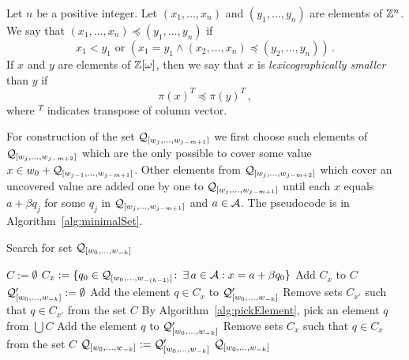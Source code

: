 \begin{defn}
\label{def:lexicographical}
Let $n$ be a positive integer. Let $(x_1, \dots, x_n)$ and $(y_1, \dots, y_n)$ are elements of $\mathbb{Z}^n$. We say that $(x_1, \dots, x_n)\preceq (y_1, \dots, y_n)$ if 
$$
x_1<y_1 \text{ or } \left(x_1=y_1 \wedge (x_2, \dots, x_n)\preceq (y_2, \dots, y_n)\right)\,.
$$
If $x$ and $y$ are elements of $\mathbb{Z}[\omega]$, then we say that $x$ is \emph{lexicographically smaller} than $y$ if
$$
\pi(x)^T \preceq \pi(y)^T\,,
$$
where $^T$ indicates transpose of column vector.
\end{defn}


\begin{upravit}
For construction of the set $\mathcal{Q}_{[w_j,\dots, w_{j-m+1}]}$ we first choose such elements of $\mathcal{Q}_{[w_j,\dots, w_{j-m+2}]}$ which are the only possible to cover some value $x \in w_0 + \mathcal{Q}_{[w_{j-1},\dots, w_{j-m+1}]}$. Other elements from $\mathcal{Q}_{[w_j,\dots, w_{j-m+2}]}$ which cover an uncovered value are added one by one to $\mathcal{Q}_{[w_j,\dots, w_{j-m+1}]}$ until each $x$ equals $a+\beta q_j$ for some $q_j$ in $\mathcal{Q}_{[w_j,\dots, w_{j-m+1}]}$ and $a\in\mathcal{A}$. The pseudocode is in Algorithm~\ref{alg:minimalSet}. 
\end{upravit}

\begin{algorithm}
  \caption{Search for set $\mathcal{Q}_{[w_{0}, \dots, w_{-k}]}$ }
    \label{alg:minimalSet}
  \begin{algorithmic}[1]
    \STATE $C:=\emptyset$
    	\STATE $C_x:= \{q_0\in\mathcal{Q}_{[w_{0}, \dots, w_{-(k-1)}]}\colon\, \exists \, a\in\mathcal{A}: x=a+\beta q_0 \}$
        \STATE Add $C_x$ to $C$
    \ENDFOR
    \STATE $\mathcal{Q}_{[w_{0}, \dots, w_{-k}]}':=\emptyset$
    		\STATE Add the element $q\in C_x$ to $\mathcal{Q}_{[w_{0}, \dots, w_{-k}]}'$
	        \STATE Remove sets $C_{x'}$ such that $q \in C_{x'}$  from the set $C$ 
	    \ENDIF
	\ENDFOR
        \STATE By Algorithm~\ref{alg:pickElement},  pick an element $q$ from $\bigcup C$
        \STATE Add the element $q$ to $\mathcal{Q}_{[w_{0}, \dots, w_{-k}]}'$
        \STATE Remove sets $C_x$ such that $q \in C_x$  from the set $C$ 
    \ENDWHILE
	\STATE $\mathcal{Q}_{[w_{0}, \dots, w_{-k}]}:=\mathcal{Q}_{[w_{0}, \dots, w_{-k}]}'$
    \RETURN $\mathcal{Q}_{[w_{0}, \dots, w_{-k}]}$
  \end{algorithmic}
\end{algorithm}


